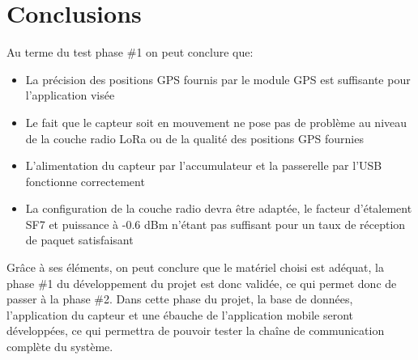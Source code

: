 \section{Conclusions}

Au terme du test phase \#1 on peut conclure que:

\begin{itemize}
\item La précision des positions GPS fournis par le module GPS est suffisante pour l'application visée
\item Le fait que le capteur soit en mouvement ne pose pas de problème au niveau de la couche radio LoRa ou de la qualité des positions GPS fournies
\item L'alimentation du capteur par l'accumulateur et la passerelle par l'USB fonctionne correctement
\item La configuration de la couche radio devra être adaptée, le facteur d'étalement SF7 et puissance à -0.6 dBm n'étant pas suffisant pour un taux de réception de paquet satisfaisant
\end{itemize}

Grâce à ses éléments, on peut conclure que le matériel choisi est adéquat, la phase \#1 du développement du projet est donc validée, ce qui permet donc de passer à la phase \#2. Dans cette phase du projet, la base de données, l'application du capteur et une ébauche de l'application mobile seront développées, ce qui permettra de pouvoir tester la chaîne de communication complète du système.





